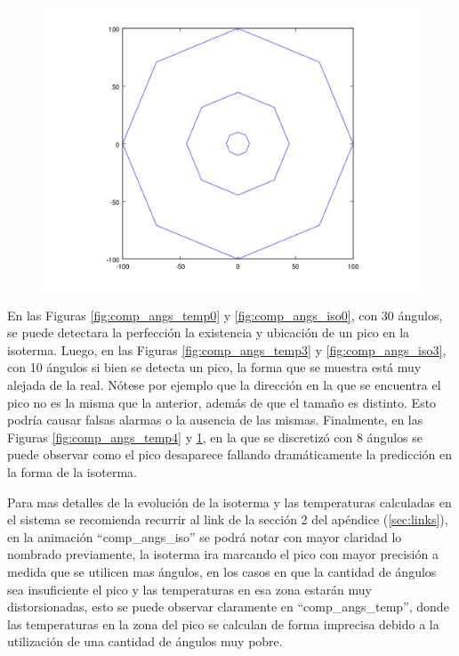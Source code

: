 \begin{figure}[H]
\begin{minipage}{0.30\textwidth}
  \centering
    \includegraphics[width=1\textwidth]{imgs/comp_angulos/comp_angs_iso4.png} 
  \caption{}
  \label{fig:comp_angs_iso4}
\end{minipage}
\end{figure}

En las Figuras \ref{fig:comp_angs_temp0} y \ref{fig:comp_angs_iso0}, con 30 ángulos, se puede detectara la perfección la existencia y ubicación de un pico en la isoterma. Luego, en las Figuras \ref{fig:comp_angs_temp3} y \ref{fig:comp_angs_iso3}, con 10 ángulos si bien se detecta un pico, la forma que se muestra está muy alejada de la real. Nótese por ejemplo que la dirección en la que se encuentra el pico no es la misma que la anterior, además de que el tamaño es distinto. Esto podría causar falsas alarmas o la ausencia de las mismas.
Finalmente, en las Figuras \ref{fig:comp_angs_temp4} y \ref{fig:comp_angs_iso4}, en la que se discretizó con 8 ángulos se puede observar como el pico desaparece fallando dramáticamente la predicción en la forma de la isoterma. 

Para mas detalles de la evolución de la isoterma y las temperaturas calculadas en el sistema se recomienda recurrir al link de la sección 2 del apéndice (\ref{sec:links}), en la animación ``comp\_angs\_iso'' se podrá notar con mayor claridad lo nombrado previamente, la isoterma ira marcando el pico con mayor precisión a medida que se utilicen mas ángulos, en los casos en que la cantidad de ángulos sea insuficiente el pico y las temperaturas en esa zona estarán muy distorsionadas, esto se puede observar claramente en ``comp\_angs\_temp'', donde las temperaturas en la zona del pico se calculan de forma imprecisa debido a la utilización de una cantidad de ángulos muy pobre.


